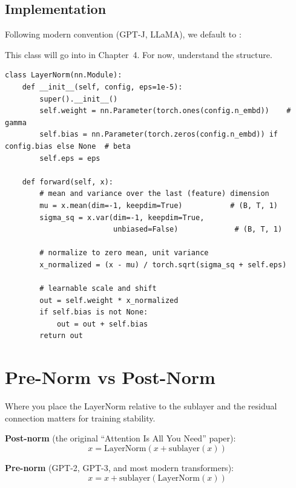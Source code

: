 \subsection{Implementation}

Following modern convention (GPT-J, LLaMA), we default to :

This class will go into  in Chapter~4. For now, understand the structure.

\concepttag
\begin{lstlisting}
class LayerNorm(nn.Module):
    def __init__(self, config, eps=1e-5):
        super().__init__()
        self.weight = nn.Parameter(torch.ones(config.n_embd))    # gamma
        self.bias = nn.Parameter(torch.zeros(config.n_embd)) if config.bias else None  # beta
        self.eps = eps

    def forward(self, x):
        # mean and variance over the last (feature) dimension
        mu = x.mean(dim=-1, keepdim=True)           # (B, T, 1)
        sigma_sq = x.var(dim=-1, keepdim=True,
                         unbiased=False)             # (B, T, 1)

        # normalize to zero mean, unit variance
        x_normalized = (x - mu) / torch.sqrt(sigma_sq + self.eps)

        # learnable scale and shift
        out = self.weight * x_normalized
        if self.bias is not None:
            out = out + self.bias
        return out
\end{lstlisting}


\section{Pre-Norm vs Post-Norm}

Where you place the LayerNorm relative to the sublayer and the residual connection matters for training stability.

\textbf{Post-norm} (the original ``Attention Is All You Need'' paper):
\[
x = \mathrm{LayerNorm}(x + \mathrm{sublayer}(x))
\]

\textbf{Pre-norm} (GPT-2, GPT-3, and most modern transformers):
\[
x = x + \mathrm{sublayer}(\mathrm{LayerNorm}(x))
\]

